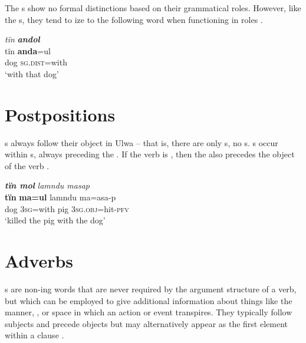 The s show no formal distinctions based on their grammatical roles. However, like the s, they tend to ize to the following word when functioning in  roles .


\ea\label{ex:overview:45}
 \textit{tïn} \textbf{\textit{andol}}\\
\gll    tïn    \textbf{anda}=ul\\
    dog {\textsc{sg.dist=}}{with}\\
\glt    ‘with that dog’
\z

\section{Postpositions}\label{sec:overview:2.8}


s always follow their object in Ulwa -- that is, there are only s, no s. s occur within s, always preceding the . If the verb is , then the  also precedes the object of the verb .


\ea%
    \label{ex:overview:46}
    \textbf{\textit{tïn mol}} \textit{lamndu masap}\\
\gll    \textbf{tïn}    \textbf{ma=ul}    lamndu  ma=asa-p\\
    dog  \textsc{3sg=}with  pig      \textsc{3sg.obj}=hit-\textsc{pfv}\\
\glt    ‘killed the pig with the dog’
\z

\section{Adverbs}\label{sec:overview:2.9}


s are non-ing words that are never required by the argument structure of a verb, but which can be employed to give additional information about things like the manner, , or space in which an action or event transpires. They typically follow subjects and precede objects  but may alternatively appear as the first element within a clause .

